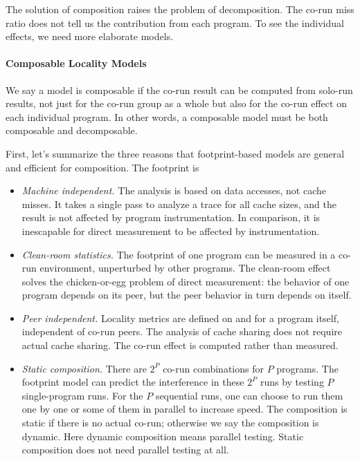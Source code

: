 The solution of composition raises the problem of decomposition.
The co-run miss ratio does not tell us the contribution from each
program.  To see the individual effects, we need more elaborate models.

\paragraph{Composable Locality Models}
We say a model is composable if the co-run result can be computed from
solo-run results, not just for the co-run group as a whole but also
for the co-run effect on each individual program.  In other words,
a composable model must be both composable and decomposable.

First, let's summarize the three reasons that footprint-based models
are general and efficient for composition.  The footprint is

\begin{itemize}
\item \emph{Machine independent.}  The analysis is based on data
  accesses, not cache misses.  It takes a single pass to analyze a
  trace for all cache sizes, and the result is not affected by program
  instrumentation.  In comparison, it is inescapable for direct measurement to be
  affected by instrumentation.
\item \emph{Clean-room statistics.}  The
  footprint of one program can be measured in a co-run environment, unperturbed by
  other programs.  The clean-room effect solves the chicken-or-egg
  problem of direct measurement: the behavior of one program depends on 
  its peer, but the peer behavior in turn depends on itself.
\item \emph{Peer independent.}  Locality metrics are
  defined on and for a program itself, independent of co-run peers.
  The analysis of cache sharing does not require actual cache 
  sharing.  The co-run effect is computed rather than measured.
\item \emph{Static composition.}  There are $2^P$ co-run combinations
  for $P$ programs.  The footprint model can predict the interference
  in these $2^P$ runs by testing $P$ single-program runs.  For the $P$
  sequential runs, one can choose to run them one by one or some of
  them in parallel to increase speed. The composition is static if
  there is no actual co-run; otherwise we say the composition is
  dynamic.  Here dynamic composition means parallel testing.  Static
  composition does not need parallel testing at all.
\end{itemize}

